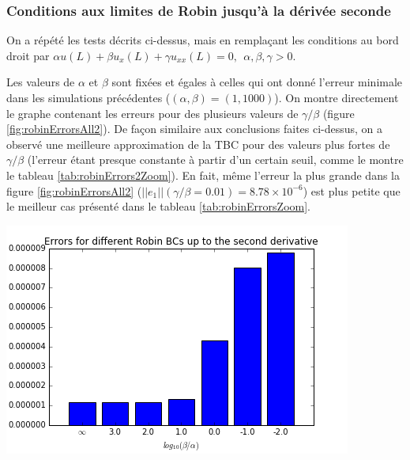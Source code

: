 \subsubsection{Conditions aux limites de Robin jusqu'à la dérivée seconde}

\indent On a répété les tests décrits ci-dessus, mais en remplaçant les conditions au bord droit par $\alpha u(L) + \beta u_x(L) + \gamma u_{xx}(L) = 0,  \ \ \alpha,\beta, \gamma > 0$.

\indent Les valeurs de $\alpha$ et $\beta$ sont fixées et égales à celles qui ont donné l'erreur minimale dans les simulations précédentes ($(\alpha,\beta) = (1,1000)$). On montre directement le graphe contenant les erreurs pour des plusieurs valeurs de $\gamma/\beta$ (figure \ref{fig:robinErrorsAll2}). De façon similaire aux conclusions faites ci-dessus, on a observé une meilleure approximation de la TBC pour des valeurs plus fortes de $\gamma/\beta$ (l'erreur étant presque constante à partir d'un certain seuil, comme le montre le tableau \ref{tab:robinErrors2Zoom}). En fait, même l'erreur la plus grande dans la figure \ref{fig:robinErrorsAll2} ($||e_1||(\gamma/\beta = 0.01) = 8.78 \times 10^{-6}$) est plus petite que le meilleur cas présenté dans le tableau \ref{tab:robinErrorsZoom}.

\begingroup
\begin{center}
		\includegraphics[scale=.6]{figures/robinErrors2.png}
\end{center}
\endgroup

